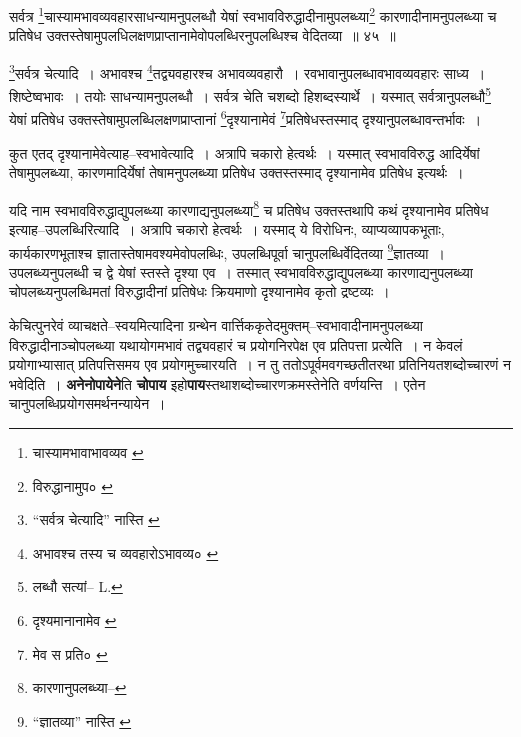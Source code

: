 \documentclass[article,12pt,a4paper]{memoir}
\begin{document}
	  \bigskip
	  \begingroup
	

	  \pstart सर्वत्र \footnote{चास्यामभावाभावव्यव \cite{dp-edE}}\-चास्यामभावव्यवहारसाधन्यामनुपलब्धौ येषां स्वभावविरुद्धादीनामुपलब्ध्या\footnote{विरुद्धानामुप० \cite{dp-msC}} कारणादीनामनुपलब्ध्या च प्रतिषेध उक्तस्तेषामुपलधिलक्षणप्राप्तानामेवोपलब्धिरनुपलब्धिश्च वेदितव्या ॥ ४५ ॥
	\pend
      
	  \endgroup
	 

	  \pstart \footnote{“सर्वत्र चेत्यादि” नास्ति \cite{dp-edH} \cite{dp-edN}}\-सर्वत्र चेत्यादि । अभावश्च \footnote{अभावश्च तस्य च व्यवहारोऽभावव्य० \cite{dp-msA} \cite{dp-edP} \cite{dp-edH} \cite{dp-edE}}\-तद्व्यवहारश्च अभावव्यवहारौ । रवभावानुपलब्धावभावव्यवहारः साध्य । शिष्टेष्वभावः । तयोः साधन्यामनुपलब्धौ । सर्वत्र चेति चशब्दो हिशब्दस्यार्थे । यस्मात् सर्वत्रानुपलब्धौ\footnote{लब्धौ सत्यां--\cite{dp-msB} \cite{dp-edH} L.} येषां प्रतिषेध उक्तस्तेषामुपलब्धिलक्षणप्राप्तानां \footnote{दृश्यमानानामेव \cite{dp-msB}}\-दृश्यानामेवं \footnote{मेव स प्रति० \cite{dp-msA} \cite{dp-edP} \cite{dp-edH} \cite{dp-edE} \cite{dp-edN}}\-प्रतिषेधस्तस्माद् दृश्यानुपलब्धावन्तर्भावः ।
	\pend
       

	  \pstart कुत एतद् दृश्यानामेवेत्याह--स्वभावेत्यादि । अत्रापि चकारो हेत्वर्थः । यस्मात् स्वभावविरुद्ध आदिर्येषां तेषामुपलब्ध्या, कारणमादिर्येषां तेषामनुपलब्ध्या प्रतिषेध उक्तस्तस्माद् दृश्यानामेव प्रतिषेध इत्यर्थः ।
	\pend
       

	  \pstart यदि नाम स्वभावविरुद्धाद्युपलब्ध्या कारणाद्यनुपलब्ध्या\footnote{कारणानुपलब्ध्या--\cite{dp-msC}} च प्रतिषेध उक्तस्तथापि कथं दृश्यानामेव प्रतिषेध इत्याह--उपलब्धिरित्यादि । अत्रापि चकारो हेत्वर्थः । यस्माद् ये विरोधिनः, व्याप्यव्यापकभूताः, कार्यकारणभूताश्च ज्ञातास्तेषामवश्यमेवोपलब्धिः, उपलब्धिपूर्वा चानुपलब्धिर्वेदितव्या \footnote{“ज्ञातव्या” नास्ति \cite{dp-msA} \cite{dp-msB} \cite{dp-edP} \cite{dp-edH} \cite{dp-edE} \cite{dp-edN}}\-ज्ञातव्या । उपलब्ध्यनुपलब्धी च द्वे येषां स्तस्ते दृश्या एव । तस्मात् स्वभावविरुद्धाद्युपलब्ध्या कारणाद्यनुपलब्ध्या चोपलब्ध्यनुपलब्धिमतां विरुद्धादीनां प्रतिषेधः क्रियमाणो दृश्यानामेव कृतो द्रष्टव्यः ।
	\pend
      
	  \endgroup
	

	  \pstart केचित्पुनरेवं व्याचक्षते--स्वयमित्यादिना ग्रन्थेन वार्त्तिककृतेदमुक्तम्--स्वभावादीनामनुपलब्ध्या विरुद्धादीनाञ्चोपलब्ध्या यथायोगमभावं तद्व्यवहारं च प्रयोगनिरपेक्ष एव प्रतिपत्ता प्रत्येति । न केवलं प्रयोगाभ्यासात् प्रतिपत्तिसमय एव प्रयोगमुच्चारयति । न तु ततोऽपूर्वमवगच्छतीतरथा प्रतिनियतशब्दोच्चारणं न भवेदिति । \textbf{अनेनोपायेने}ति \textbf{चोपाय} इहो\textbf{पाय}स्तथाशब्दोच्चारणक्रमस्तेनेति वर्णयन्ति । एतेन चानुपलब्धिप्रयोगसमर्थनन्यायेन ।
	\pend
	  \bigskip
	  \begingroup
	
\end{document}
